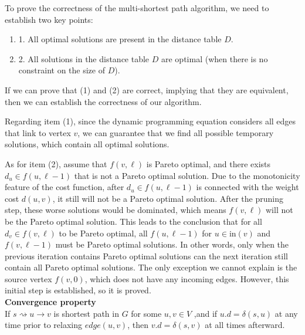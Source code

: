 To prove the correctness of the multi-shortest path algorithm, we need to establish two key points:


\begin{enumerate}
    \item 1. All optimal solutions are present in the distance table $D$.
    \item 2. All solutions in the distance table $D$ are optimal (when there is no constraint on the size of $D$).
\end{enumerate}

If we can prove that (1) and (2) are correct, implying that they are equivalent, then we can establish the correctness of our algorithm.

Regarding item (1), since the dynamic programming equation considers all edges that link to vertex $v$, we can guarantee that we find all possible temporary solutions, which contain all optimal solutions.

As for item (2), assume that $f(v, \ell)$ is Pareto optimal, and there exists $d_u \in f(u, \ell-1)$ that is not a Pareto optimal solution. Due to the monotonicity feature of the cost function, after $d_u \in f(u, \ell-1)$ is connected with the weight cost $d(u, v)$, it still will not be a Pareto optimal solution. After the pruning step, these worse solutions would be dominated, which means $f(v, \ell)$ will not be the Pareto optimal solution. This leads to the conclusion that for all $d_v \in f(v, \ell)$ to be Pareto optimal, all $f(u, \ell-1)$ for $u \in \text{in}(v)$ and $f(v, \ell-1)$ must be Pareto optimal solutions. In other words, only when the previous iteration contains Pareto optimal solutions can the next iteration still contain all Pareto optimal solutions. The only exception we cannot explain is the source vertex $f(v, 0)$, which does not have any incoming edges. However, this initial step is established, so it is proved.\\

\textbf{Convergence property}\\
If $s \rightsquigarrow u \rightarrow v$ is shortest path in $G$ for some $u,v \in V$ ,and if $u.d = \delta(s,u)$ at any time prior to relaxing $edge(u,v)$, then $v.d = \delta(s,v)$ at all times afterward.\\


